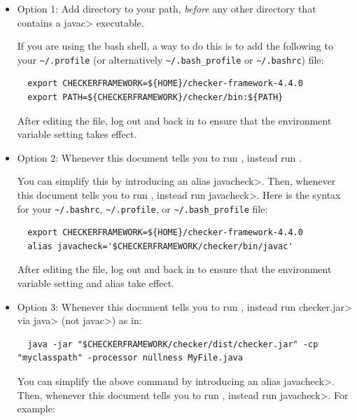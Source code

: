 \begin{itemize}
  \item
    Option 1:
    Add directory
     to your path, \emph{before} any other
    directory that contains a \<javac> executable.

    If you are
    using the bash shell, a way to do this is to add the following to your
    \verb|~/.profile| (or alternatively \verb|~/.bash_profile| or \verb|~/.bashrc|) file:
\begin{Verbatim}
  export CHECKERFRAMEWORK=${HOME}/checker-framework-4.4.0
  export PATH=${CHECKERFRAMEWORK}/checker/bin:${PATH}
\end{Verbatim}

   After editing the file, log out and back in to ensure that the environment variable
   setting takes effect.

  \item
    \begin{sloppypar}
    Option 2:
    Whenever this document tells you to run ,
    instead run .
    \end{sloppypar}

    You can simplify this by introducing an alias \<javacheck>.  Then,
    whenever this document tells you to run , instead run
    \<javacheck>.  Here is the syntax for your
    \verb|~/.bashrc|, \verb|~/.profile|, or \verb|~/.bash_profile|
    file:
\begin{Verbatim}
  export CHECKERFRAMEWORK=${HOME}/checker-framework-4.4.0
  alias javacheck='$CHECKERFRAMEWORK/checker/bin/javac'
\end{Verbatim}

   After editing the file, log out and back in to ensure that the environment variable
   setting and alias take effect.

   \item
   Option 3:
   Whenever this document tells you to run , instead
   run \<checker.jar> via \<java> (not \<javac>) as in:

\begin{Verbatim}
  java -jar "$CHECKERFRAMEWORK/checker/dist/checker.jar" -cp "myclasspath" -processor nullness MyFile.java
\end{Verbatim}

    You can simplify the above command by introducing an alias
    \<javacheck>.  Then, whenever this document tells you to run
    , instead run \<javacheck>.  For example:


\end{itemize}
